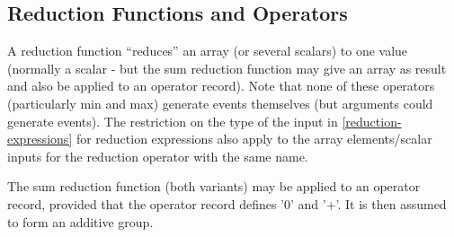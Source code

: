 \subsection{Reduction Functions and Operators}

A reduction function ``reduces'' an array (or several scalars) to one
value (normally a scalar - but the sum reduction function may give an
array as result and also be applied to an operator record). Note that
none of these operators (particularly min and max) generate events
themselves (but arguments could generate events). The restriction on the
type of the input in \autoref{reduction-expressions} for reduction expressions also
apply to the array elements/scalar inputs for the reduction operator
with the same name.

The sum reduction function (both variants) may be applied to an operator
record, provided that the operator record defines '0' and '+'. It is
then assumed to form an additive group.

